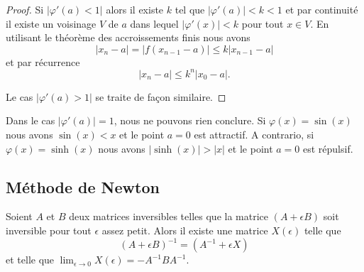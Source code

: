 \begin{proof}
    Si \( | \varphi'(a)<1 |\) alors il existe \( k\) tel que \( | \varphi'(a) |<k<1\) et par continuité il existe un voisinage \( V\) de \( a\) dans lequel \( | \varphi'(x) |<k\) pour tout \( x\in V\). En utilisant le théorème des accroissements finis nous avons
    \begin{equation}
        | x_n-a |=\big| f(x_{n-1}-a) \big|\leq k| x_{n-1}-a |
    \end{equation}
    et par récurrence
    \begin{equation}
        | x_n-a |\leq k^n| x_0-a |.
    \end{equation}

    Le cas \( | \varphi'(a)>1 |\) se traite de façon similaire.
\end{proof}

\begin{remark}
    Dans le cas \(| \varphi'(a) |=1\), nous ne pouvons rien conclure. Si \( \varphi(x)=\sin(x)\) nous avons \( \sin(x)<x\) et le point \( a=0\) est attractif. A contrario, si \( \varphi(x)=\sinh(x)\) nous avons \( |\sinh(x)|>|x|\) et le point \( a=0\) est répulsif.
\end{remark}

\subsection{Méthode de Newton}

\begin{lemma}       \label{LemXdObnV}
    Soient \( A\) et \( B\) deux matrices inversibles telles que la matrice \( (A+\epsilon B)\) soit inversible pour tout \( \epsilon\) assez petit. Alors il existe une matrice \( X(\epsilon)\) telle que
    \begin{equation}
        (A+\epsilon B)^{-1}=(A^{-1}+\epsilon X)
    \end{equation}
    et telle que \( \lim_{\epsilon\to 0}X(\epsilon)=-A^{-1} BA^{-1}\).
\end{lemma}

